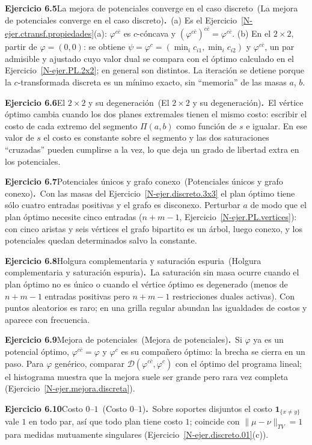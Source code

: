 \documentclass[11pt,a4paper]{amsart}
\newcommand{\D}{{\mathcal D}}
\newcommand{\I}{{\mathbf 1}}
\theoremstyle{remark}
\theoremstyle{definition}
\numberwithin{subsection}{section}
\numberwithin{equation}{section}
\newcommand{\ejlabel}[2]{\par\medskip\noindent\textbf{Ejercicio #1}\ifx\relax#2\relax\else\ (#2)\fi\textbf{.}\ }
\begin{document}
\ejlabel{6.5}{La mejora de potenciales converge en el caso discreto}(a) Es el Ejercicio~\ref{N-ejer.ctransf.propiedades}(a): $\varphi^{c\bar c}$ es $c$-cóncava y $(\varphi^{c\bar c})^{c\bar c}=\varphi^{c\bar c}$. (b) En el $2\times2$, partir de $\varphi=(0,0)$: se obtiene $\psi=\varphi^c=(\min_ic_{i1},\min_ic_{i2})$ y $\varphi^{c\bar c}$, un par admisible y ajustado cuyo valor dual se compara con el óptimo calculado en el Ejercicio~\ref{N-ejer.PL.2x2}; en general son distintos. La iteración se detiene porque la $c$-transformada discreta es un mínimo exacto, sin ``memoria'' de las masas $a$, $b$.

\ejlabel{6.6}{El $2\times2$ y su degeneración}El vértice óptimo cambia cuando los dos planes extremales tienen el mismo costo: escribir el costo de cada extremo del segmento $\Pi(a,b)$ como función de $s$ e igualar. En ese valor de $s$ el costo es constante sobre el segmento y las dos saturaciones ``cruzadas'' pueden cumplirse a la vez, lo que deja un grado de libertad extra en los potenciales.

\ejlabel{6.7}{Potenciales únicos y grafo conexo}Con las masas del Ejercicio~\ref{N-ejer.discreto.3x3} el plan óptimo tiene sólo cuatro entradas positivas y el grafo es disconexo. Perturbar $a$ de modo que el plan óptimo necesite cinco entradas ($n+m-1$, Ejercicio~\ref{N-ejer.PL.vertices}): con cinco aristas y seis vértices el grafo bipartito es un árbol, luego conexo, y los potenciales quedan determinados salvo la constante.

\ejlabel{6.8}{Holgura complementaria y saturación espuria}La saturación sin masa ocurre cuando el plan óptimo no es único o cuando el vértice óptimo es degenerado (menos de $n+m-1$ entradas positivas pero $n+m-1$ restricciones duales activas). Con puntos aleatorios es raro; en una grilla regular abundan las igualdades de costos y aparece con frecuencia.

\ejlabel{6.9}{Mejora de potenciales}Si $\varphi$ ya es un potencial óptimo, $\varphi^{c\bar c}=\varphi$ y $\varphi^c$ es su compañero óptimo: la brecha se cierra en un paso. Para $\varphi$ genérico, comparar $\D(\varphi^{c\bar c},\varphi^c)$ con el óptimo del programa lineal; el histograma muestra que la mejora suele ser grande pero rara vez completa (Ejercicio~\ref{N-ejer.mejora.discreta}).

\ejlabel{6.10}{Costo $0$--$1$}Sobre soportes disjuntos el costo $\I_{\{x\ne y\}}$ vale $1$ en todo par, así que todo plan tiene costo $1$; coincide con $\|\mu-\nu\|_{TV}=1$ para medidas mutuamente singulares (Ejercicio~\ref{N-ejer.discreto.01}(c)).
\end{document}

